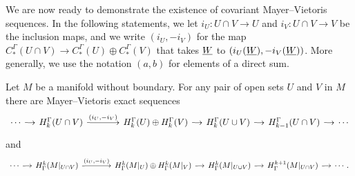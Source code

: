 We are now ready to demonstrate the existence of covariant Mayer--Vietoris sequences.
In the following statements, we let $i_U \colon U \cap V \to U$ and $i_V \colon U \cap V \to V$ be the inclusion maps, and we write $(i_U, -i_V)$ for the map $C_*^{\Gamma}(U \cap V) \to C_*^{\Gamma}(U) \oplus C_*^{\Gamma}(V)$ that takes $\underline{W}$ to $(i_U(\underline{W}), -i_V(\underline{W}))$.
More generally, we use the notation $(a,b)$ for elements of a direct sum.


\begin{theorem}\label{T: relative MV}
	Let $M$ be a manifold without boundary.
	For any pair of open sets $U$ and $V$ in $M$ there are Mayer--Vietoris exact sequences
	\begin{equation*}
		\begin{tikzcd}[
			column sep = small,
			arrow style = math font,
			cells = {nodes = {text height = 2ex,text depth = 0.75ex}}
			]
			\cdots \arrow[r] & H^{\Gamma}_{k}(U \cap V) \arrow[r, "(i_U{,} -i_V)"] & [25pt] H^{\Gamma}_k(U) \oplus H^{\Gamma}_{k}(V)
			\arrow[r] & H_{k}^{\Gamma}(U \cup V) \arrow[r] & H_{k-1}^{\Gamma}(U \cap V) \arrow[r] & \cdots
		\end{tikzcd}
	\end{equation*}
	and
	\begin{equation*}
		\begin{tikzcd}[
			column sep = small,
			arrow style = math font,
			cells = {nodes = {text height = 2ex,text depth = 0.75ex}}
			]
			\cdots \arrow[r] & H_{\Gamma}^{k}(M|_{U \cap V}) \arrow[r, "(i_U{,} -i_V)"] & [25pt] H_{\Gamma}^k(M|_U) \oplus H_{\Gamma}^{k}(M|_V)
			\arrow[r] & H^{k}_{\Gamma}(M|_{U \cup V}) \arrow[r] & H^{k+1}_{\Gamma}(M|_{U \cap V}) \arrow[r] & \cdots.
		\end{tikzcd}
	\end{equation*}
\end{theorem}

